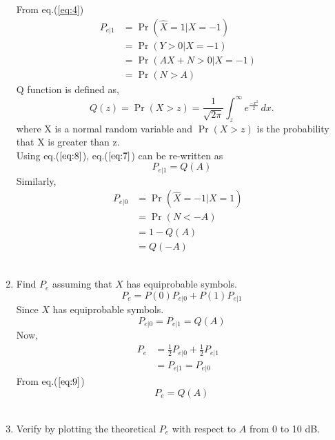 \documentclass[journal,12pt,twocolumn]{IEEEtran}
\providecommand{\pr}[1]{\ensuremath{\Pr\left(#1\right)}}
\begin{document}
\begin{enumerate}
From eq.(\ref{eq:4})
\begin{align}
P_{e|1}& = \pr{\hat{X} = 1|X=-1}&    \nonumber
\\
&=  \pr{Y>0|X=-1}&
\\
&=  \pr{AX+N>0|X=-1}&
\\
&=  \pr{N>A}&               \label{eq:7}
\end{align}
Q function is defined as,
\begin{equation}
Q(z) =\pr{X>z}= {\frac {1}{\sqrt {2\pi }}}\int _{z}^{\infty }e^{\frac{-x^{2}}{2}}\,dx.               \label{eq:8}
\end{equation}
where X is a  normal random variable and $\pr{X > z}$ is the probability that X is greater than z.
\\
Using eq.($\ref{eq:8}$), eq.($\ref{eq:7}$) can be re-written as
\\
\begin{equation}
P_{e|1} = Q(A)         \label{eq:9}
\end{equation}  
Similarly,
\begin{align}
P_{e|0}& = \pr{\hat{X} = -1|X=1}&    \nonumber
\\
&=  \pr{N<-A}&
\\
&= 1-Q(A)&
\\
&= Q(-A)&       \label{eq:12}
\end{align}
\\
\item Find $P_e$ assuming that $X$ has equiprobable symbols.
\\
\begin{equation}
P_e = P(0)P_{e|0}+P(1)P_{e|1}          
\end{equation} 
Since $X$ has equiprobable symbols.
\\
\begin{equation}
P_{e|0} = P_{e|1} = Q(A)        
\end{equation} 
Now,
\begin{align}
P_e &= \frac{1}{2}P_{e|0}+\frac{1}{2}P_{e|1}&
\\
&=P_{e|1}=P_{e|0}& 
\end{align}
From eq.($\ref{eq:9}$)
\begin{equation}
P_e=Q(A)
\end{equation}
\\
\item Verify by plotting  the theoretical $P_e$ with respect to $A$ from 0 to 10 dB.
\\        
\begin{figure}[h]
    \centering

\end{figure}
\end{enumerate}
\end{document}
